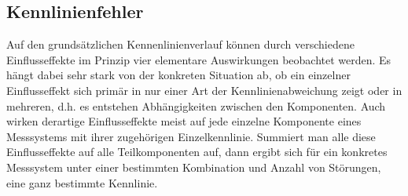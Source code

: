\documentclass[letterpaper,10pt,english]{jupyterBook}
\begin{document}
\subsection{Kennlinienfehler}
\label{\detokenize{content/2_realeKennlinie:kennlinienfehler}}
\sphinxAtStartPar


\sphinxAtStartPar
Auf den grundsätzlichen Kennenlinienverlauf können durch verschiedene Einflusseffekte im Prinzip vier elementare Auswirkungen beobachtet werden.
Es hängt dabei sehr stark von der konkreten Situation ab, ob ein einzelner Einflusseffekt sich primär in nur einer Art der Kennlinienabweichung zeigt oder in mehreren, d.h. es entstehen Abhängigkeiten zwischen den Komponenten.
Auch wirken derartige Einflusseffekte meist auf jede einzelne Komponente eines Messsystems mit ihrer zugehörigen Einzelkennlinie. Summiert man alle diese Einflusseffekte auf alle Teilkomponenten auf, dann ergibt sich für ein konkretes Messsystem unter einer bestimmten Kombination und Anzahl von Störungen, eine ganz bestimmte  Kennlinie.
\end{document}
